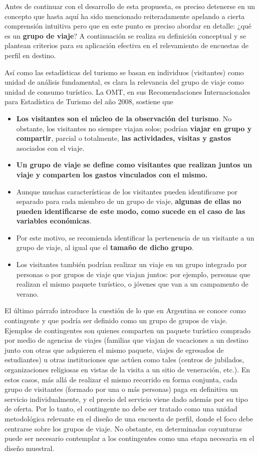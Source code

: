 \documentclass[
]{book}
\begin{document}
Antes de continuar con el desarrollo de esta propuesta, es preciso detenerse en un concepto que hasta aquí ha sido mencionado reiteradamente apelando a cierta comprensión intuitiva pero que en este punto es preciso abordar en detalle: ¿qué es un \textbf{grupo de viaje}? A continuación se realiza su definición conceptual y se plantean criterios para su aplicación efectiva en el relevamiento de encuestas de perfil en destino.

Así como las estadísticas del turismo se basan en individuos (visitantes) como unidad de análisis fundamental, es clara la relevancia del grupo de viaje como unidad de consumo turístico. La OMT, en sus Recomendaciones Internacionales para Estadística de Turismo del año 2008, sostiene que

\begin{itemize}
\item
  \textbf{Los visitantes son el núcleo de la observación del turismo}. No obstante, los visitantes no siempre viajan solos; podrían \textbf{viajar en grupo y compartir}, parcial o totalmente, \textbf{las actividades, visitas y gastos} asociados con el viaje.
\item
  \textbf{Un grupo de viaje se define como visitantes que realizan juntos un viaje y comparten los gastos vinculados con el mismo.}
\item
  Aunque muchas características de los visitantes pueden identificarse por separado para cada miembro de un grupo de viaje, \textbf{algunas de ellas no pueden identificarse de este modo, como sucede en el caso de las variables económicas}.
\item
  Por este motivo, se recomienda identificar la pertenencia de un visitante a un grupo de viaje, al igual que el \textbf{tamaño de dicho grupo}.
\item
  Los visitantes también podrían realizar un viaje en un grupo integrado por personas o por grupos de viaje que viajan juntos: por ejemplo, personas que realizan el mismo paquete turístico, o jóvenes que van a un campamento de verano.\\
\end{itemize}

El último párrafo introduce la cuestión de lo que en Argentina se conoce como contingente y que podría ser definido como un grupo de grupos de viaje. Ejemplos de contingentes son quienes comparten un paquete turístico comprado por medio de agencias de viajes (familias que viajan de vacaciones a un destino junto con otras que adquieren el mismo paquete, viajes de egresados de estudiantes) u otras instituciones que actúen como tales (centros de jubilados, organizaciones religiosas en vistas de la visita a un sitio de veneración, etc.). En estos casos, más allá de realizar el mismo recorrido en forma conjunta, cada grupo de visitantes (formado por una o más personas) paga en definitiva un servicio individualmente, y el precio del servicio viene dado además por su tipo de oferta. Por lo tanto, el contingente no debe ser tratado como una unidad metodológica relevante en el diseño de una encuesta de perfil, donde el foco debe centrarse sobre los grupos de viaje. No obstante, en determinadas coyunturas puede ser necesario contemplar a los contingentes como una etapa necesaria en el diseño muestral.
\end{document}
